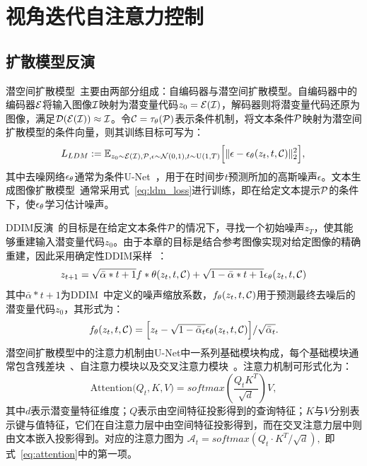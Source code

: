 \section{视角迭代自注意力控制}
\subsection{扩散模型反演}
潜空间扩散模型~\cite{Rombach_2022_CVPR_stablediffusion}主要由两部分组成：自编码器与潜空间扩散模型。自编码器中的编码器$\mathcal{E}$将输入图像$\mathcal{I}$映射为潜变量代码$z_0=\mathcal{E}(\mathcal{I})$，解码器则将潜变量代码还原为图像，满足$\mathcal{D}(\mathcal{E}(\mathcal{I})) \approx \mathcal{I}$。令$\mathcal{C}=\tau_\theta(\mathcal{P})$表示条件机制，将文本条件$\mathcal{P}$映射为潜空间扩散模型的条件向量，则其训练目标可写为：
\begin{equation}
L_{LDM} := \mathbb{E}_{z_0 \sim \mathcal{E}(\mathcal{I}), \mathcal{P}, \epsilon \sim \mathcal{N}(0, 1), t \sim \text{U}(1,T) }\Big[ \Vert \epsilon - \epsilon_\theta(z_{t},t, \mathcal{C}) \Vert_{2}^{2}\Big], \, 
\label{eq:ldm_loss}
\end{equation}
其中去噪网络$\epsilon_\theta$通常为条件U-Net~\cite{ronneberger2015unet}，用于在时间步$t$预测所加的高斯噪声$\epsilon$。文本生成图像扩散模型~\cite{saharia2022photorealistic, ramesh2022hierarchical, rombach2022high,nichol2021glide}通常采用式~\ref{eq:ldm_loss}进行训练，即在给定文本提示$\mathcal{P}$的条件下，使$\epsilon_\theta$学习估计噪声。


DDIM反演~\cite{song2021ddim}的目标是在给定文本条件$\mathcal{P}$的情况下，寻找一个初始噪声$z_T$，使其能够重建输入潜变量代码$z_0$。由于本章的目标是结合参考图像实现对给定图像的精确重建，因此采用确定性DDIM采样~\cite{song2021ddim}：
\begin{equation}
z_{t+1} = \sqrt{\bar{\alpha}*{t+1}}f*\theta(z_t,t,\mathcal{C}) + \sqrt{1-\bar{\alpha}*{t+1}} \epsilon_\theta(z_t,t,\mathcal{C})
\label{eq:ddim}
\end{equation}
其中$\bar{\alpha}*{t+1}$为DDIM~\cite{song2021ddim}中定义的噪声缩放系数，$f_\theta(z_t,t,\mathcal{C})$用于预测最终去噪后的潜变量代码$z_0$，其形式为：
\begin{equation}
f_\theta(z_t,t,\mathcal{C}) = \Big[z_t - \sqrt{1-\bar{\alpha}_t} \epsilon_\theta(z_t,t,\mathcal{C}) \Big] / {\sqrt{\bar{\alpha}_t}}.
\end{equation}
潜空间扩散模型中的注意力机制由U-Net中一系列基础模块构成，每个基础模块通常包含残差块~\cite{he2016deep}、自注意力模块以及交叉注意力模块~\cite{vaswani2017attention}。注意力机制可形式化为：
\begin{equation}
\label{eq:attention}
\text{Attention}\mathcal(Q_t, K, V)= softmax(\frac{Q_{t}K^T}{\sqrt{d}})V,
\end{equation}
其中$d$表示潜变量特征维度；$Q$表示由空间特征投影得到的查询特征；$K$与$V$分别表示键与值特征，它们在自注意力层中由空间特征投影得到，而在交叉注意力层中则由文本嵌入投影得到。对应的注意力图为
$
\mathcal{A}_t=softmax(Q_t \cdot K^T / \sqrt{d}),
$
即式~\ref{eq:attention}中的第一项。

